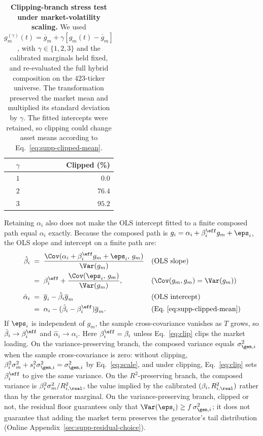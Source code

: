 \begin{table}[H]
\centering
\caption{\textbf{Clipping-branch stress test under market-volatility
    scaling.} We used
    $g_m^{(\gamma)}(t)=\overline{g}_m+
    \gamma[g_m(t)-\overline{g}_m]$, with
    $\gamma\in\{1,2,3\}$ and the calibrated marginals held fixed,
    and re-evaluated the full hybrid composition on the $423$-ticker
    universe. The transformation preserved the market mean and
    multiplied its standard deviation by $\gamma$. The fitted
    intercepts were retained, so clipping could change asset means
    according to Eq.~\eqref{eq:supp-clipped-mean}.}
\label{tab:stress}
\small
\begin{tabular}{@{}rr@{}}
\toprule
\textbf{$\gamma$} & \textbf{Clipped (\%)} \\ \midrule
$1$ & $0.0$  \\
$2$ & $76.4$ \\
$3$ & $95.2$ \\
\bottomrule
\end{tabular}
\end{table}

Retaining $\alpha_i$ also does not make the OLS intercept fitted to a
finite composed path equal $\alpha_i$ exactly. Because the composed
path is $g_i = \alpha_i + \beta_i^{\eff} g_m + \eps_i$, the OLS slope
and intercept on a finite path are:
\begin{align}
  \hat\beta_i
    &\;=\; \frac{\Cov(\alpha_i + \beta_i^{\eff} g_m + \eps_i,\, g_m)}{\Var(g_m)}
    && \text{(OLS slope)} \notag \\
    &\;=\; \beta_i^{\eff} + \frac{\Cov(\eps_i,\, g_m)}{\Var(g_m)},
    && \text{($\Cov(g_m, g_m) = \Var(g_m)$)} \notag \\
  \hat\alpha_i
    &\;=\; \overline{g}_i-\hat\beta_i\overline{g}_m
    && \text{(OLS intercept)} \notag \\
    &\;=\; \alpha_i-(\hat\beta_i-\beta_i^{\eff})\overline{g}_m.
    && \text{(Eq.~\eqref{eq:supp-clipped-mean})}
\end{align}
If $\eps_i$ is independent of $g_m$, the sample cross-covariance
vanishes as $T$ grows, so $\hat\beta_i \to \beta_i^{\eff}$ and
$\hat\alpha_i \to \alpha_i$. Here $\beta_i^{\eff}=\beta_i$ unless
Eq.~\eqref{eq:clip} clips the market loading. On the
variance-preserving branch, the composed variance equals
$\sigma_{\gen,i}^2$ when the sample cross-covariance is zero: without
clipping, $\beta_i^2 \sigma_m^2 + s_i^2 \sigma_{\gen,i}^2 =
\sigma_{\gen,i}^2$ by Eq.~\eqref{eq:scale}, and under clipping,
Eq.~\eqref{eq:clip} sets $\beta_i^{\eff}$ to give the same variance.
On the $R^2$-preserving branch, the composed variance is
$\beta_i^2 \sigma_m^2 / R^2_{i,\real}$, the value implied by the
calibrated $(\beta_i, R^2_{i,\real})$ rather than by the generator
marginal. On the variance-preserving branch, clipped or not, the
residual floor guarantees only that $\Var(\eps_i)\geq
f\,\sigma_{\gen,i}^2$; it does not guarantee that adding the market
term preserves the generator's tail distribution (Online
Appendix~\ref{sec:supp-residual-choice}).


